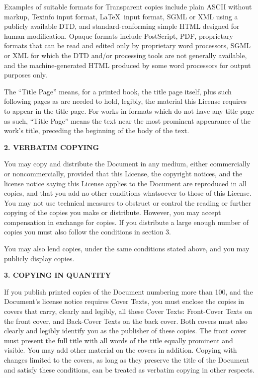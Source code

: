 Examples of suitable formats for Transparent copies include plain
ASCII without markup, Texinfo input format, \LaTeX~input format, SGML
or XML using a publicly available DTD, and standard-conforming simple
HTML designed for human modification.  Opaque formats include
PostScript, PDF, proprietary formats that can be read and edited only
by proprietary word processors, SGML or XML for which the DTD and/or
processing tools are not generally available, and the
machine-generated HTML produced by some word processors for output
purposes only.

The ``Title Page'' means, for a printed book, the title page itself,
plus such following pages as are needed to hold, legibly, the material
this License requires to appear in the title page.  For works in
formats which do not have any title page as such, ``Title Page'' means
the text near the most prominent appearance of the work's title,
preceding the beginning of the body of the text.


\begin{center}
{\Large\bf 2. VERBATIM COPYING\par}
\end{center}


You may copy and distribute the Document in any medium, either
commercially or noncommercially, provided that this License, the
copyright notices, and the license notice saying this License applies
to the Document are reproduced in all copies, and that you add no other
conditions whatsoever to those of this License.  You may not use
technical measures to obstruct or control the reading or further
copying of the copies you make or distribute.  However, you may accept
compensation in exchange for copies.  If you distribute a large enough
number of copies you must also follow the conditions in section 3.

You may also lend copies, under the same conditions stated above, and
you may publicly display copies.


\begin{center}
{\Large\bf 3. COPYING IN QUANTITY\par}
\end{center}


If you publish printed copies of the Document numbering more than 100,
and the Document's license notice requires Cover Texts, you must enclose
the copies in covers that carry, clearly and legibly, all these Cover
Texts: Front-Cover Texts on the front cover, and Back-Cover Texts on
the back cover.  Both covers must also clearly and legibly identify
you as the publisher of these copies.  The front cover must present
the full title with all words of the title equally prominent and
visible.  You may add other material on the covers in addition.
Copying with changes limited to the covers, as long as they preserve
the title of the Document and satisfy these conditions, can be treated
as verbatim copying in other respects.

